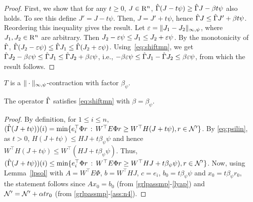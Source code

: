 \begin{proof}
First, we show that for any $t\ge 0$,  $J\in \mathrm{R}^n$,
$\hat{\Gamma}( J - t \psi) \ge \hat{\Gamma} J - \beta t \psi$ also holds.
To see this define $J' = J-t\psi$. Then, $J = J'+t\psi$, hence $\hat{\Gamma} J \le \hat{\Gamma} J' + \beta t \psi$. Reordering this inequality gives the result.
Let $\varepsilon = \|J_1 - J_2\|_{\infty,\psi}$, where $J_1,J_2\in \mathrm{R}^n$ are arbitrary.
Then $J_2 - \varepsilon \psi \le J_1 \le J_2 + \varepsilon \psi$. 
By the monotonicity of $\hat{\Gamma}$,
$\hat{\Gamma}(J_2 - \varepsilon \psi) \le \hat{\Gamma} J_1 \le \hat{\Gamma}(J_2 + \varepsilon \psi)$. 
Using~\eqref{eq:shiftmn}, we get 
$\hat{\Gamma} J_2 - \beta \varepsilon \psi \le \hat{\Gamma} J_1 \le \hat{\Gamma} J_2 + \beta \varepsilon \psi$, i.e., $-\beta \varepsilon \psi \le \hat{\Gamma} J_1 - \hat{\Gamma} J_2 \le \beta \varepsilon \psi$, from which the result follows.
\end{proof}
\begin{corollary}\label{tmaxnormmn}
$T$ is a $\|\cdot\|_{\infty,\psi}$-contraction with factor $\beta_{\psi}$.
\end{corollary}
\begin{lemma}\label{gshiftmn}
The operator $\hat{\Gamma}$ satisfies \eqref{eq:shiftmn} with $\beta = \beta_\psi$.
\end{lemma}
\begin{proof}
By definition, for $1\le i \le n$, $(\hat{\Gamma} (J+t\psi) )(i) = \min\{ e_i^\top \Phi r \,:\, W^\top E\Phi r \ge W^\top H(J+t\psi), r\in \mathcal{N}' \}$.
By \eqref{eq:psilin}, as $t>0$, $H(J+t\psi) \le HJ + t \beta_\psi \psi$ and hence $W^\top H(J+t\psi) \le W^\top (HJ + t \beta_\psi \psi)$. Thus,
$(\hat{\Gamma} (J+t\psi) )(i) \le 
 \min\{ e_i^\top \Phi r \,:\, W^\top E\Phi r \ge W^\top HJ+t\beta_\psi \psi), r\in \mathcal{N}' \}$.
Now, using Lemma~\ref{lpsol} with $A=W^\top E \Phi$, $b=W^\top HJ$, $c=e_i$, $b_0=t\beta_\psi \psi$ 
and $x_0=t \beta_\psi r_0$, the statement follows since $A x_0 = b_0$ (from \cref{grlpassmp}-\eqref{lyap}) and $\mathcal{N}' = \mathcal{N}' + \alpha t r_0$ (from \cref{grlpassmp}-\eqref{ass:n4}).
\end{proof}
\begin{comment}
\begin{theorem}\label{gmaxcontramn}
The operator $\Gamma  \colon \R^n\ra \R^n$ is a contraction operator in $\norm{\cdot}_{\mn}$ with factor $\beta_{\psi}$.
\end{theorem}
\end{comment}
